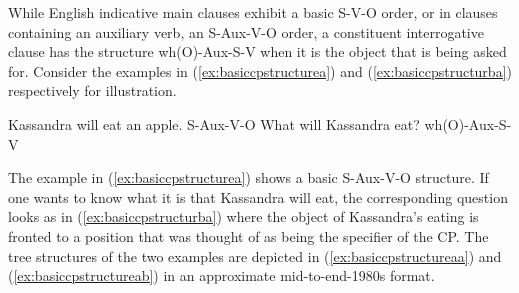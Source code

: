 While English indicative main clauses exhibit a basic S-V-O order, or in clauses containing an auxiliary verb, an S-Aux-V-O order, a constituent interrogative clause has the structure wh(O)-Aux-S-V when it is the object that is being asked for. Consider the examples in (\ref{ex:basiccpstructurea}) and (\ref{ex:basiccpstructurba}) respectively for illustration.


\begin{exe}
\ex\begin{xlist} 
\ex Kassandra will eat an apple. \hfill S-Aux-V-O\label{ex:basiccpstructurea}
\ex What will Kassandra eat? \hfill wh(O)-Aux-S-V \label{ex:basiccpstructurba}
\end{xlist}
\end{exe} 

\noindent The example in (\ref{ex:basiccpstructurea}) shows a basic S-Aux-V-O structure. If one wants to know what it is that Kassandra will eat, the corresponding question looks as in (\ref{ex:basiccpstructurba}) where the object of Kassandra's eating is fronted to a position that was thought of as being the specifier of the CP. The tree structures of the two examples are depicted in (\ref{ex:basiccpstructureaa}) and (\ref{ex:basiccpstructureab}) in an approximate mid-to-end-1980s format.

